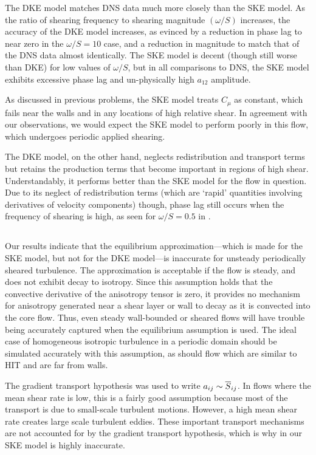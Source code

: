 \documentclass[11pt]{article}
\begin{document}
The DKE model matches DNS data much more closely than the SKE model. As the ratio of shearing frequency to shearing magnitude $(\omega/S)$ increases, the accuracy of the DKE model increases, as evinced by a reduction in phase lag to near zero in the $\omega/S=10$ case, and a reduction in magnitude to match that of the DNS data almost identically. The SKE model is decent (though still worse than DKE) for low values of $\omega/S$, but in all comparisons to DNS, the SKE model exhibits excessive phase lag and un-physically high $a_{12}$ amplitude.

As discussed in previous problems, the SKE model treats $C_\mu$ as constant, which fails near the walls and in any locations of high relative shear. In agreement with our observations, we would expect the SKE model to perform poorly in this flow, which undergoes periodic applied shearing.

The DKE model, on the other hand, neglects redistribution and transport terms but retains the production terms that become important in regions of high shear. Understandably, it performs better than the SKE model for the flow in question. Due to its neglect of redistribution terms (which are `rapid' quantities involving derivatives of velocity components) though, phase lag still occurs when the frequency of shearing is high, as seen for $\omega/S = 0.5$ in .

\subsection{}

Our results indicate that the equilibrium approximation---which is made for the SKE model, but not for the DKE model---is inaccurate for unsteady periodically sheared turbulence. The approximation is acceptable if the flow is steady, and does not exhibit decay to isotropy. Since this assumption holds that the convective derivative of the anisotropy tensor is zero, it provides no mechanism for anisotropy generated near a shear layer or wall to decay as it is convected into the core flow. Thus, even steady wall-bounded or sheared flows will have trouble being accurately captured when the equilibrium assumption is used. The ideal case of homogeneous isotropic turbulence in a periodic domain should be simulated accurately with this assumption, as should flow which are similar to HIT and are far from walls.

The gradient transport hypothesis was used to write $a_{ij} \sim \overline{S}_{ij}$. In flows where the mean shear rate is low, this is a fairly good assumption because most of the transport is due to small-scale turbulent motions. However, a high mean shear rate creates large scale turbulent eddies. These important transport mechanisms are not accounted for by the gradient transport hypothesis, which is why in our SKE model is highly inaccurate.
\end{document}
